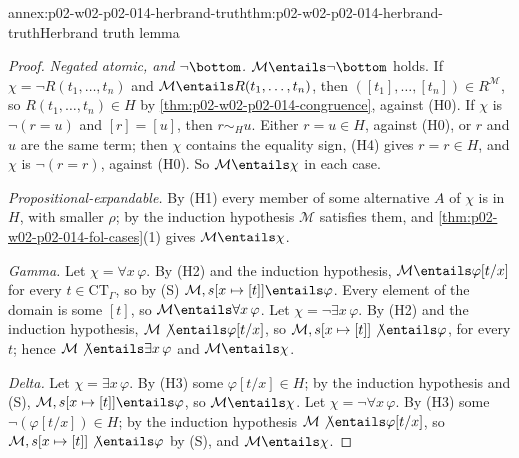 \begin{annexitem}{annex:p02-w02-p02-014-herbrand-truth}{thm:p02-w02-p02-014-herbrand-truth}{Herbrand truth lemma}
\begin{proof}
\emph{Negated atomic, and \(\neg\bottom\).}  \(\mathcal M\entails\neg\bottom\)
holds.  If \(\chi=\neg R(t_1,\ldots,t_n)\) and
\(\mathcal M\entails R(t_1,\ldots,t_n)\), then
\(([t_1],\ldots,[t_n])\in R^{\mathcal M}\), so \(R(t_1,\ldots,t_n)\in H\) by
\cref{thm:p02-w02-p02-014-congruence}, against (H0).  If \(\chi\) is
\(\neg(r=u)\) and \([r]=[u]\), then \(r\sim_H u\).  Either \(r=u\in H\),
against (H0), or \(r\) and \(u\) are the same term; then \(\chi\) contains the
equality sign, (H4) gives \(r=r\in H\), and \(\chi\) is \(\neg(r=r)\),
against (H0).  So \(\mathcal M\entails\chi\) in each case.

\emph{Propositional-expandable.}  By (H1) every member of some alternative
\(A\) of \(\chi\) is in \(H\), with smaller \(\rho\); by the induction
hypothesis \(\mathcal M\) satisfies them, and
\cref{thm:p02-w02-p02-014-fol-cases}(1) gives \(\mathcal M\entails\chi\).

\emph{Gamma.}  Let \(\chi=\forall x\,\varphi\).  By (H2) and the induction
hypothesis, \(\mathcal M\entails\varphi[t/x]\) for every
\(t\in\mathrm{CT}_{\Gamma}\), so by (S)
\(\mathcal M,s[x\mapsto[t]]\entails\varphi\).  Every element of the domain
is some \([t]\), so \(\mathcal M\entails\forall x\,\varphi\).  Let
\(\chi=\neg\exists x\,\varphi\).  By (H2) and the induction hypothesis,
\(\mathcal M\not\entails\varphi[t/x]\), so
\(\mathcal M,s[x\mapsto[t]]\not\entails\varphi\), for every \(t\); hence
\(\mathcal M\not\entails\exists x\,\varphi\) and \(\mathcal M\entails\chi\).

\emph{Delta.}  Let \(\chi=\exists x\,\varphi\).  By (H3) some
\(\varphi[t/x]\in H\); by the induction hypothesis and (S),
\(\mathcal M,s[x\mapsto[t]]\entails\varphi\), so \(\mathcal M\entails\chi\).
Let \(\chi=\neg\forall x\,\varphi\).  By (H3) some \(\neg(\varphi[t/x])\in H\);
by the induction hypothesis \(\mathcal M\not\entails\varphi[t/x]\), so
\(\mathcal M,s[x\mapsto[t]]\not\entails\varphi\) by (S), and
\(\mathcal M\entails\chi\).
\end{proof}
\end{annexitem}

